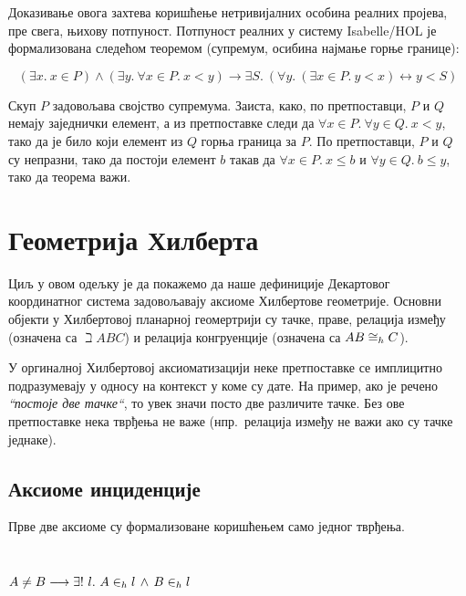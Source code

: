 Доказивање овога захтева коришћење нетривијалних особина реалних
пројева, пре свега, њихову потпуност. Потпуност реалних у систему
Isabelle/HOL је формализована следећом теоремом (супремум, осибина
најмање горње границе):

\vspace{-7mm}
$$(\exists x.\ x \in P) \wedge (\exists y.\ \forall x\in P.\ x < y) \longrightarrow
\exists S.\ (\forall y.\ (\exists x\in P.\ y < x) \leftrightarrow y <
S)$$
\vspace{-7mm}

Скуп $P$ задовољава својство супремума. Заиста, како, по претпоставци,
$P$ и $Q$ немају заједнички елемент, а из претпоставке следи да
$\forall x \in P.\ \forall y \in Q.\ x < y$, тако да је било који
елемент из $Q$ горња граница за $P$. По претпоставци, $P$ и $Q$ су
непразни, тако да постоји елемент $b$ такав да $\forall x \in P.\ x
\leq b$ и $\forall y \in Q.\ b \leq y$, тако да теорема важи.

\section{Геометрија Хилберта}
\label{sec:hilbert}

Циљ у овом одељку је да покажемо да наше дефиниције Декартовог
координатног система задовољавају аксиоме Хилбертове
геометрије. Основни објекти у Хилбертовој планарној геомертрији су
тачке, праве, релација између (означена са $\beth{A}{B}{C}$) и
релација конгруенције (означена са $\congrh{A}{B}{C}$).


У оргиналној Хилбертовој аксиоматизацији \cite{hilbert} неке
претпоставке се имплицитно подразумевају у односу на контекст у коме
су дате. На пример, ако је речено \emph{``постоје две тачке``}, то
увек значи посто две различите тачке. Без ове претпоставке нека
тврђења не важе (нпр.~релација између не важи ако су тачке једнаке).


\subsection{Аксиоме инциденције}

Прве две аксиоме су формализоване коришћењем само једног тврђења.
{\tt
\begin{tabbing}
$A \neq B \longrightarrow \exists!\ l.\ \inh{A}{l} \,\wedge\, \inh{B}{l}$
\end{tabbing}
}

